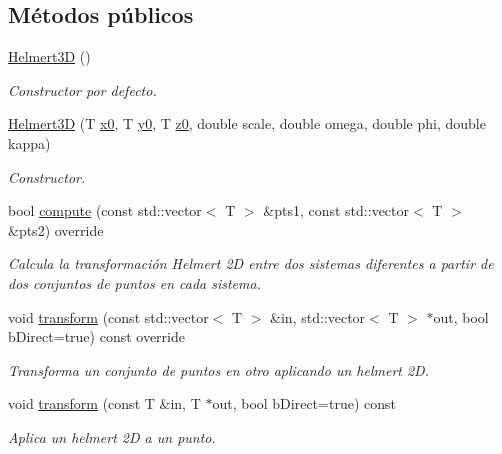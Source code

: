 \subsection*{Métodos públicos}
\begin{DoxyCompactItemize}
\item 
\hyperlink{class_i3_d_1_1_helmert3_d_a3f0ea1eee87fd53c2632ddc78a602f28}{Helmert3D} ()
\begin{DoxyCompactList}\small\item\em Constructor por defecto. \end{DoxyCompactList}\item 
\hyperlink{class_i3_d_1_1_helmert3_d_a4b44e4b5680a999a95f88b05eab127f4}{Helmert3D} (T \hyperlink{class_i3_d_1_1_helmert3_d_a57421e1c701909b5a319dfeaba50fe20}{x0}, T \hyperlink{class_i3_d_1_1_helmert3_d_a8367d52bdb3d60a015e9c30ce7ccacde}{y0}, T \hyperlink{class_i3_d_1_1_helmert3_d_aaa4da06457bac6b987d41a93b9d29d1e}{z0}, double scale, double omega, double phi, double kappa)
\begin{DoxyCompactList}\small\item\em Constructor. \end{DoxyCompactList}\item 
bool \hyperlink{group__trf3_d_group_gaf6c9d07daaca435365b84688326885e3}{compute} (const std\+::vector$<$ T $>$ \&pts1, const std\+::vector$<$ T $>$ \&pts2) override
\begin{DoxyCompactList}\small\item\em Calcula la transformación Helmert 2D entre dos sistemas diferentes a partir de dos conjuntos de puntos en cada sistema. \end{DoxyCompactList}\item 
void \hyperlink{group__trf3_d_group_ga986e7df721d9a5bb12a0eed3ab10f419}{transform} (const std\+::vector$<$ T $>$ \&in, std\+::vector$<$ T $>$ $\ast$out, bool b\+Direct=true) const  override
\begin{DoxyCompactList}\small\item\em Transforma un conjunto de puntos en otro aplicando un helmert 2D. \end{DoxyCompactList}\item 
void \hyperlink{group__trf3_d_group_gab1392ba7d1b7522384cbf73540b6682d}{transform} (const T \&in, T $\ast$out, bool b\+Direct=true) const 
\begin{DoxyCompactList}\small\item\em Aplica un helmert 2D a un punto. \end{DoxyCompactList}\item 

\end{DoxyCompactItemize}

